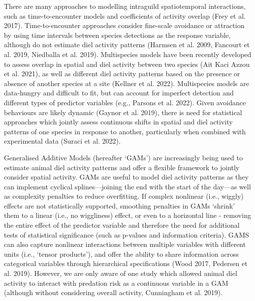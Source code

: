 \documentclass[preprint, 3p, authoryear]{elsarticle} %
\begin{document}
There are many approaches to modelling intraguild spatiotemporal interactions, such as time-to-encounter models and coefficients of activity overlap (Frey et al. 2017). Time-to-encounter approaches consider fine-scale avoidance or attraction by using time intervals between species detections as the response variable, although do not estimate diel activity patterns (Harmsen et al. 2009, Fancourt et al. 2019, Niedballa et al. 2019). Multispecies models have been recently developed to assess overlap in spatial and diel activity between two species (Ait Kaci Azzou et al. 2021), as well as different diel activity patterns based on the presence or absence of another species at a site (Kellner et al. 2022). Multispecies models are data-hungry and difficult to fit, but can account for imperfect detection and different types of predictor variables (e.g., Parsons et al. 2022). Given avoidance behaviours are likely dynamic (Gaynor et al. 2019), there is need for statistical approaches which jointly assess continuous shifts in spatial and diel activity patterns of one species in response to another, particularly when combined with experimental data (Suraci et al. 2022).

Generalised Additive Models (hereafter `GAMs') are increasingly being used to estimate animal diel activity patterns and offer a flexible framework to jointly consider spatial activity. GAMs are useful to model diel activity patterns as they can implement cyclical splines---joining the end with the start of the day---as well as complexity penalties to reduce overfitting. If complex nonlinear (i.e., wiggly) effects are not statistically supported, smoothing penalties in GAMs `shrink' them to a linear (i.e., no wiggliness) effect, or even to a horizontal line - removing the entire effect of the predictor variable and therefore the need for additional tests of statistical significance (such as p-values and information criteria). GAMS can also capture nonlinear interactions between multiple variables with different units (i.e., `tensor products'), and offer the ability to share information across categorical variables through hierarchical specifications (Wood 2017, Pedersen et al. 2019). However, we are only aware of one study which allowed animal diel activity to interact with predation risk as a continuous variable in a GAM (although without considering overall activity, Cunningham et al. 2019).
\end{document}
